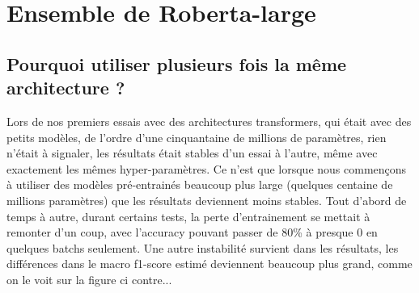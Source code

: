 \chapter{Ensemble de Roberta-large}

\section{Pourquoi utiliser plusieurs fois la même architecture ?}
Lors de nos premiers essais avec des architectures transformers, qui était avec des petits modèles, de l'ordre d'une cinquantaine de millions de paramètres, rien n'était à signaler, les résultats était stables d'un essai à l'autre, même avec exactement les mêmes hyper-paramètres. Ce n'est que lorsque nous commençons à utiliser des modèles pré-entrainés beaucoup plus large (quelques centaine de millions paramètres) que les résultats deviennent moins stables. Tout d'abord de temps à autre, durant certains tests, la perte d'entrainement se mettait à remonter d'un coup, avec l'accuracy pouvant passer de 80\% à presque 0 en quelques batchs seulement. Une autre instabilité survient dans les résultats, les différences dans le macro f1-score estimé deviennent beaucoup plus grand, comme on le voit sur la figure ci contre...

